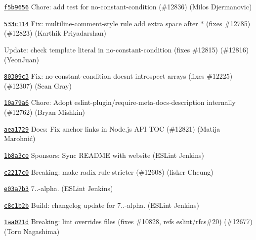 \begin{DoxyItemize}
\item \href{https://github.com/eslint/eslint/commit/f5b96564f732962f46755adbb33c49fae9af6a92}{\texttt{ {\ttfamily f5b9656}}} Chore\+: add test for no-\/constant-\/condition (\#12836) (Milos Djermanovic)
\item \href{https://github.com/eslint/eslint/commit/533c1140dc98bebdc3ae8334ab2e6c27c7df0c21}{\texttt{ {\ttfamily 533c114}}} Fix\+: multiline-\/comment-\/style rule add extra space after \texorpdfstring{$\ast$}{*} (fixes \#12785) (\#12823) (Karthik Priyadarshan)
\item \href{https://github.com/eslint/eslint/commit/0460748cda67ddc4a4cb0db3cdf187a742d09bf8}{\texttt{ {}}} Update\+: check template literal in no-\/constant-\/condition (fixes \#12815) (\#12816) (Yeon\+Juan)
\item \href{https://github.com/eslint/eslint/commit/80309c3791188ac5d1c4eebc99ede323a55336e6}{\texttt{ {\ttfamily 80309c3}}} Fix\+: no-\/constant-\/condition doesn\textquotesingle{}t introspect arrays (fixes \#12225) (\#12307) (Sean Gray)
\item \href{https://github.com/eslint/eslint/commit/10a79a672b42d51539bcd6ace482be7afa5f34f8}{\texttt{ {\ttfamily 10a79a6}}} Chore\+: Adopt {\ttfamily eslint-\/plugin/require-\/meta-\/docs-\/description} internally (\#12762) (Bryan Mishkin)
\item \href{https://github.com/eslint/eslint/commit/aea172998ec4e2af1d9186b6767c3f34428945f4}{\texttt{ {\ttfamily aea1729}}} Docs\+: Fix anchor links in Node.\+js API TOC (\#12821) (Matija Marohnić)
\item \href{https://github.com/eslint/eslint/commit/1b8a3ce15237b9085f2761dcf73655207e6169a6}{\texttt{ {\ttfamily 1b8a3ce}}} Sponsors\+: Sync README with website (ESLint Jenkins)
\item \href{https://github.com/eslint/eslint/commit/c2217c04d6c82b160a21b00fca39c8acec543403}{\texttt{ {\ttfamily c2217c0}}} Breaking\+: make {\ttfamily radix} rule stricter (\#12608) (fisker Cheung)
\item \href{https://github.com/eslint/eslint/commit/e03a7b311cb9ddf55914b1496683609bd564de2f}{\texttt{ {\ttfamily e03a7b3}}} 7..-\/alpha. (ESLint Jenkins)
\item \href{https://github.com/eslint/eslint/commit/c8c1b2b2efadfcd3c04aaf15bd793c5b4dd84cb6}{\texttt{ {\ttfamily c8c1b2b}}} Build\+: changelog update for 7..-\/alpha. (ESLint Jenkins)
\item \href{https://github.com/eslint/eslint/commit/1aa021d77fdd2c68d7b7d2f4603252110c414b32}{\texttt{ {\ttfamily 1aa021d}}} Breaking\+: lint {\ttfamily overrides} files (fixes \#10828, refs eslint/rfcs\#20) (\#12677) (Toru Nagashima)

\end{DoxyItemize}
